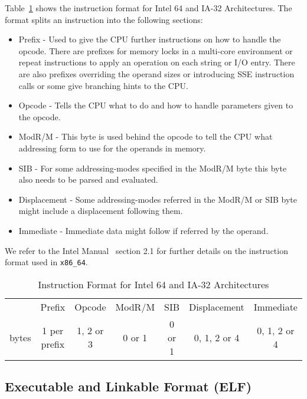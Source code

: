 Table~\ref{tab:instrfor} shows the instruction format for Intel 64 and IA-32
Architectures. The format splits an instruction into the following sections:

\begin{itemize}
  \item Prefix - Used to give the CPU further instructions on how to handle the
opcode. There are prefixes for memory locks in a multi-core environment or
repeat instructions to apply an operation on each string or I/O entry. There are
also prefixes overriding the operand sizes or introducing SSE instruction calls
or some give branching hints to the CPU.
  \item Opcode - Tells the CPU what to do and how to handle parameters given to
the opcode.
  \item ModR/M - This byte is used behind the opcode to tell the CPU what
addressing form to use for the operands in memory.
  \item SIB - For some addressing-modes specified in the ModR/M byte this byte
also needs to be parsed and evaluated.
  \item Displacement - Some addressing-modes referred in the ModR/M or SIB byte
might include a displacement following them.
  \item Immediate - Immediate data might follow if referred by the operand.
\end{itemize}

We refer to the Intel Manual~\cite{intelsys} section 2.1 for further details on
the instruction format used in \texttt{x86\_64}.

\begin{table}[]
\begin{tabular}{ccccccc}
\cline{2-7}
\multicolumn{1}{c|}{} & \multicolumn{1}{c|}{Prefix} &
\multicolumn{1}{c|}{Opcode} & \multicolumn{1}{c|}{ModR/M} &
\multicolumn{1}{c|}{SIB} & \multicolumn{1}{c|}{Displacement} &
\multicolumn{1}{c|}{Immediate} \\ \cline{2-7}
bytes         & 1 per prefix                & 1, 2 or 3
 & 0 or 1                      & 0 or 1                   & 0, 1, 2 or 4
             & 0, 1, 2 or 4
\end{tabular}
\caption{Instruction Format for Intel 64 and IA-32 Architectures}
\label{tab:instrfor}
\end{table}

\subsection{Executable and Linkable Format (ELF)}

